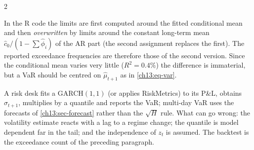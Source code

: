 \begin{paracol}{2}
\begin{coursenote}\label{ch13:cn-varcode}
In the R code the limits are first computed around the fitted conditional mean and then \emph{overwritten} by limits around the constant long-term mean $\hat c_0/(1-\sum\hat\phi_i)$ of the AR part (the second assignment replaces the first).
The reported exceedance frequencies are therefore those of the second version. Since the conditional mean varies very little ($R^2=0.4\%$) the difference is immaterial, but a VaR should be centred on $\hat\mu_{t+1}$ as in \eqref{ch13:eq-var}.
\end{coursenote}

\begin{finance}
A risk desk fits a GARCH$(1,1)$ (or applies RiskMetrics) to its P\&L, obtains $\hat\sigma_{t+1}$, multiplies by a quantile and reports the VaR; multi-day VaR uses the forecasts of \cref{ch13:sec-forecast} rather than the $\sqrt H$ rule. What can go wrong: the
volatility estimate reacts with a lag to a regime change; the quantile is model dependent far in the tail; and the independence of $z_t$ is assumed. The backtest is the exceedance count of the preceding paragraph.
\end{finance}


\end{paracol}
